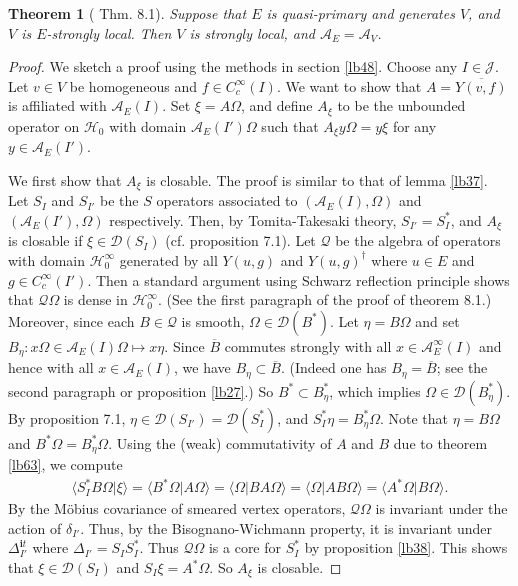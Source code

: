 \documentclass[11pt,b5paper,notitlepage]{article}
\theoremstyle{definition}
\theoremstyle{plain}
\newtheorem{thm}[df]{Theorem}
\newcommand{\mc}{\mathcal}
\newcommand{\ovl}{\overline}
\newcommand{\Dom}{\scr D}
\newcommand{\bk}[1]{\langle {#1}\rangle}
\newcommand{\scr}{\mathscr}
\newcommand{\im}{\mathbf{i}}
\numberwithin{equation}{subsection}
\begin{document}
\begin{thm}[\cite{CKLW18} Thm. 8.1]\label{lb43}
Suppose that $E$ is quasi-primary and generates $V$, and $V$ is $E$-strongly local. Then $V$ is strongly local, and $\mc A_E=\mc A_V$.
\end{thm}

\begin{proof}
We sketch a proof using the methods in section \ref{lb48}. Choose any $I\in\mc J$. Let $v\in V$ be homogeneous and $f\in C_c^\infty(I)$. We want to show that $A=\ovl{Y(v,f)}$ is affiliated with $\mc A_E(I)$. Set $\xi=A\Omega$, and define $A_\xi$ to be the unbounded operator on $\mc H_0$ with domain $\mc A_E(I')\Omega$ such that $A_\xi y\Omega=y\xi$ for any $y\in\mc A_E(I')$. 

We first show that $A_\xi$ is closable. The proof is similar to that of lemma \ref{lb37}. Let $S_I$ and $S_{I'}$ be the $S$  operators associated to $(\mc A_E(I),\Omega)$ and $(\mc A_E(I'),\Omega)$ respectively. Then, by Tomita-Takesaki theory, $S_{I'}=S_I^*$, and $A_\xi$ is closable if $\xi\in\Dom(S_I)$ (cf. \cite{Gui21b} proposition 7.1). Let $\mc Q$ be the algebra of operators with domain $\mc H_0^\infty$ generated by all $Y(u,g)$ and $Y(u,g)^\dagger$ where $u\in E$ and $g\in C_c^\infty(I')$. Then a standard argument using Schwarz reflection principle shows that $\mc Q\Omega$ is dense in $\mc H_0^\infty$. (See the first paragraph of the proof of \cite{CKLW18} theorem 8.1.) Moreover, since each $B\in\mc Q$ is smooth, $\Omega\in\Dom(B^*)$. Let $\eta=B\Omega$ and set $B_\eta:x\Omega\in\mc A_E(I)\Omega\mapsto x\eta$. Since  $\ovl B$ commutes strongly with all $x\in\mc A_E^\infty(I)$ and hence with all $x\in\mc A_E(I)$, we have $B_\eta\subset \ovl B$. (Indeed one has $B_\eta=\ovl B$; see the second paragraph or proposition \ref{lb27}.) So $B^*\subset B_\eta^*$, which implies $\Omega\in\Dom(B_\eta^*)$. By \cite{Gui21b} proposition 7.1, $\eta\in\Dom(S_{I'})=\Dom(S_I^*)$, and $S_I^*\eta=B_\eta^*\Omega$. Note that $\eta=B\Omega$ and $B^*\Omega=B_\eta^*\Omega$. Using the (weak) commutativity of $A$ and $B$ due to theorem \ref{lb63}, we compute
\begin{align*}
\bk{S_I^*B\Omega|\xi}=\bk{B^*\Omega|A\Omega}=\bk{\Omega|BA\Omega}=\bk{\Omega|AB\Omega}=\bk{A^*\Omega|B\Omega}.
\end{align*}
By the M\"obius covariance of smeared vertex operators, $\mc Q\Omega$ is invariant under the action of $\delta_{I'}$. Thus, by the Bisognano-Wichmann property, it is invariant under $\Delta_{I'}^{\im t}$ where $\Delta_{I'}=S_IS_I^*$. Thus $\mc Q\Omega$ is a core for $S_I^*$ by proposition \ref{lb38}. This shows that $\xi\in\Dom(S_I)$ and $S_I\xi=A^*\Omega$. So $A_\xi$ is closable.


\end{proof}
\end{document}
